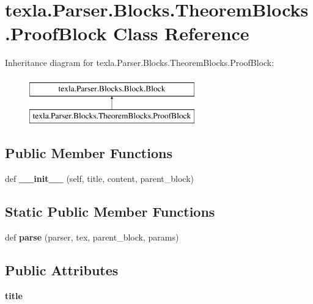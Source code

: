 \hypertarget{classtexla_1_1Parser_1_1Blocks_1_1TheoremBlocks_1_1ProofBlock}{}\section{texla.\+Parser.\+Blocks.\+Theorem\+Blocks.\+Proof\+Block Class Reference}
\label{classtexla_1_1Parser_1_1Blocks_1_1TheoremBlocks_1_1ProofBlock}
Inheritance diagram for texla.\+Parser.\+Blocks.\+Theorem\+Blocks.\+Proof\+Block\+:\begin{figure}[H]
\begin{center}
\leavevmode
\includegraphics[height=2.000000cm]{classtexla_1_1Parser_1_1Blocks_1_1TheoremBlocks_1_1ProofBlock}
\end{center}
\end{figure}
\subsection*{Public Member Functions}
\begin{DoxyCompactItemize}
\item 
\hypertarget{classtexla_1_1Parser_1_1Blocks_1_1TheoremBlocks_1_1ProofBlock_a5f38f05ef77faad7ef9c306af35807e8}{}\label{classtexla_1_1Parser_1_1Blocks_1_1TheoremBlocks_1_1ProofBlock_a5f38f05ef77faad7ef9c306af35807e8} 
def {\bfseries \+\_\+\+\_\+init\+\_\+\+\_\+} (self, title, content, parent\+\_\+block)
\end{DoxyCompactItemize}
\subsection*{Static Public Member Functions}
\begin{DoxyCompactItemize}
\item 
\hypertarget{classtexla_1_1Parser_1_1Blocks_1_1TheoremBlocks_1_1ProofBlock_a949c75a021a513290ee5b5039ecd3deb}{}\label{classtexla_1_1Parser_1_1Blocks_1_1TheoremBlocks_1_1ProofBlock_a949c75a021a513290ee5b5039ecd3deb} 
def {\bfseries parse} (parser, tex, parent\+\_\+block, params)
\end{DoxyCompactItemize}
\subsection*{Public Attributes}
\begin{DoxyCompactItemize}
\item 
\hypertarget{classtexla_1_1Parser_1_1Blocks_1_1TheoremBlocks_1_1ProofBlock_a1c553c16331caf7ad258c8e88ccb3b58}{}\label{classtexla_1_1Parser_1_1Blocks_1_1TheoremBlocks_1_1ProofBlock_a1c553c16331caf7ad258c8e88ccb3b58} 
{\bfseries title}
\end{DoxyCompactItemize}


